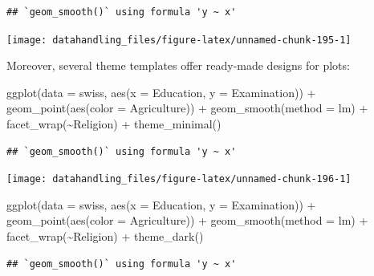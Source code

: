 \documentclass[
  12pt,
]{style/krantz}
\newenvironment{Shaded}{\begin{snugshade}}{\end{snugshade}}
\newcommand{\AttributeTok}[1]{\textcolor[rgb]{0.77,0.63,0.00}{#1}}
\newcommand{\FunctionTok}[1]{\textcolor[rgb]{0.00,0.00,0.00}{#1}}
\newcommand{\NormalTok}[1]{#1}
\newcommand{\SpecialCharTok}[1]{\textcolor[rgb]{0.00,0.00,0.00}{#1}}
\newcommand{\StringTok}[1]{\textcolor[rgb]{0.31,0.60,0.02}{#1}}
\begin{document}
\begin{verbatim}
## `geom_smooth()` using formula 'y ~ x'
\end{verbatim}

\texttt{[image: datahandling\_files/figure-latex/unnamed-chunk-195-1]}

Moreover, several theme templates offer ready-made designs for plots:

\begin{Shaded}
\begin{Highlighting}[]
\FunctionTok{ggplot}\NormalTok{(}\AttributeTok{data =}\NormalTok{ swiss, }\FunctionTok{aes}\NormalTok{(}\AttributeTok{x =}\NormalTok{ Education, }\AttributeTok{y =}\NormalTok{ Examination)) }\SpecialCharTok{+}
     \FunctionTok{geom\_point}\NormalTok{(}\FunctionTok{aes}\NormalTok{(}\AttributeTok{color =}\NormalTok{ Agriculture)) }\SpecialCharTok{+}
     \FunctionTok{geom\_smooth}\NormalTok{(}\AttributeTok{method =} \StringTok{\textquotesingle{}lm\textquotesingle{}}\NormalTok{) }\SpecialCharTok{+}
     \FunctionTok{facet\_wrap}\NormalTok{(}\SpecialCharTok{\textasciitilde{}}\NormalTok{Religion) }\SpecialCharTok{+}
     \FunctionTok{theme\_minimal}\NormalTok{()}
\end{Highlighting}
\end{Shaded}

\begin{verbatim}
## `geom_smooth()` using formula 'y ~ x'
\end{verbatim}

\texttt{[image: datahandling\_files/figure-latex/unnamed-chunk-196-1]}

\begin{Shaded}
\begin{Highlighting}[]
\FunctionTok{ggplot}\NormalTok{(}\AttributeTok{data =}\NormalTok{ swiss, }\FunctionTok{aes}\NormalTok{(}\AttributeTok{x =}\NormalTok{ Education, }\AttributeTok{y =}\NormalTok{ Examination)) }\SpecialCharTok{+}
     \FunctionTok{geom\_point}\NormalTok{(}\FunctionTok{aes}\NormalTok{(}\AttributeTok{color =}\NormalTok{ Agriculture)) }\SpecialCharTok{+}
     \FunctionTok{geom\_smooth}\NormalTok{(}\AttributeTok{method =} \StringTok{\textquotesingle{}lm\textquotesingle{}}\NormalTok{) }\SpecialCharTok{+}
     \FunctionTok{facet\_wrap}\NormalTok{(}\SpecialCharTok{\textasciitilde{}}\NormalTok{Religion) }\SpecialCharTok{+}
     \FunctionTok{theme\_dark}\NormalTok{()}
\end{Highlighting}
\end{Shaded}

\begin{verbatim}
## `geom_smooth()` using formula 'y ~ x'
\end{verbatim}
\end{document}
